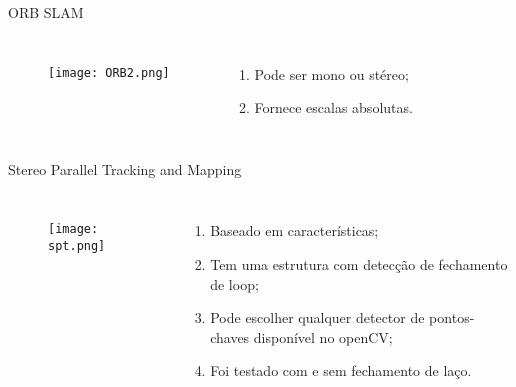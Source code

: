 \begin{frame}[c]{ORB SLAM}
    \transboxout[duration=0.5]
    \begin{columns}
            \begin{figure}
            \texttt{[image: ORB2.png]}
            \caption{\cite{ORBSLAM259}}
            \end{figure}
            \begin{enumerate}
                \item Pode ser mono ou stéreo;
                \item Fornece escalas absolutas.
            \end{enumerate}
    \end{columns}

\end{frame}
\begin{frame}[c]{Stereo Parallel Tracking and Mapping}
    \transboxout[duration=0.5]
    \begin{columns}
            \begin{figure}
            \texttt{[image: spt.png]}
            \caption{\cite{SPTAMSte99}}
            \end{figure}
            \begin{enumerate}
                \item Baseado em características;
                \item Tem uma estrutura com detecção de fechamento de loop;
                \item Pode escolher qualquer detector de pontos-chaves disponível no openCV;
                \item Foi testado com e sem fechamento de laço.
            \end{enumerate}
    \end{columns}

\end{frame}
